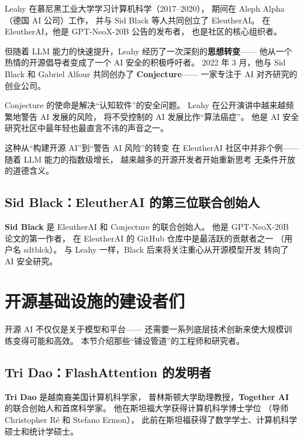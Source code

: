 Leahy 在慕尼黑工业大学学习计算机科学（2017--2020），
期间在 Aleph Alpha（德国 AI 公司）工作，
并与 Sid Black 等人共同创立了 EleutherAI。
在 EleutherAI，他是 GPT-NeoX-20B 公告的发布者，
也是社区的核心组织者。

但随着 LLM 能力的快速提升，Leahy 经历了一次深刻的\textbf{思想转变}——
他从一个热情的开源倡导者变成了一个 AI 安全的积极呼吁者。
2022 年 3 月，他与 Sid Black 和 Gabriel Alfour 共同创办了 \textbf{Conjecture}——
一家专注于 AI 对齐研究的创业公司。

Conjecture 的使命是解决``认知软件''的安全问题。
Leahy 在公开演讲中越来越频繁地警告 AI 发展的风险，
将不受控制的 AI 发展比作``算法癌症''。
他是 AI 安全研究社区中最年轻也最直言不讳的声音之一。

这种从``构建开源 AI''到``警告 AI 风险''的转变
在 EleutherAI 社区中并非个例——
随着 LLM 能力的指数级增长，
越来越多的开源开发者开始重新思考
无条件开放的道德含义。

\subsection{Sid Black：EleutherAI 的第三位联合创始人}

\textbf{Sid Black} 是 EleutherAI 和 Conjecture 的联合创始人。
他是 GPT-NeoX-20B 论文的第一作者，
在 EleutherAI 的 GitHub 仓库中是最活跃的贡献者之一
（用户名 sdtblck）。
与 Leahy 一样，Black 后来将关注重心从开源模型开发
转向了 AI 安全研究。


\section{开源基础设施的建设者们}
\label{sec:infra-builders}

开源 AI 不仅仅是关于模型和平台——
还需要一系列底层技术创新来使大规模训练变得可能和高效。
本节介绍那些``铺设管道''的工程师和研究者。

\subsection{Tri Dao：FlashAttention 的发明者}

\textbf{Tri Dao} 是越南裔美国计算机科学家，
普林斯顿大学助理教授，\textbf{Together AI} 的联合创始人和首席科学家。
他在斯坦福大学获得计算机科学博士学位
（导师 Christopher R\'e 和 Stefano Ermon），
此前在斯坦福获得了数学学士、计算机科学硕士和统计学硕士。

